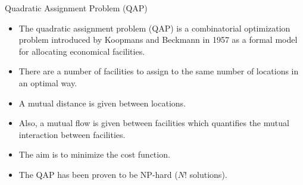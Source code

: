 \documentclass{beamer}
\begin{document}
\begin{frame}[t]{Quadratic Assignment Problem (QAP)} %
\small
\begin{itemize}
\item The quadratic assignment problem (QAP) is a combinatorial optimization problem introduced by Koopmans and Beckmann in 1957 as a formal model for allocating economical facilities.
\item There are a number of facilities to assign to the same number of locations in an optimal way.
\item A mutual distance is given between locations.
\item Also, a mutual flow is given between facilities which quantifies the mutual interaction between facilities.
\item The aim is to minimize the cost function.
\item The QAP has been proven to be NP-hard ($N!$ solutions).
\end{itemize}
\end{frame}
\end{document}
